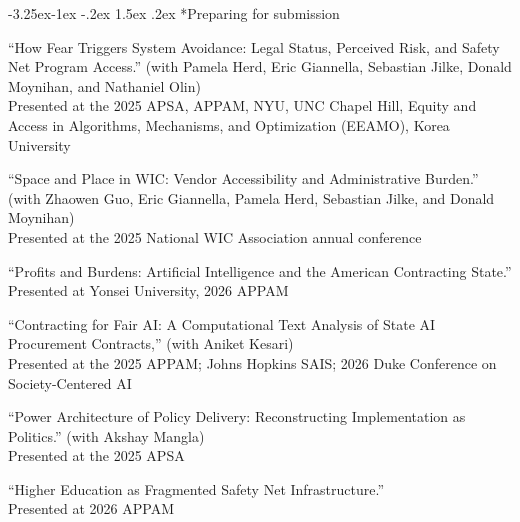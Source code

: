 \documentclass[10pt, letterpaper]{article}
\makeatletter
\renewcommand\subsection{\@startsection{subsection}{2}{\z@}%
  {-3.25ex\@plus -1ex \@minus -.2ex}%
  {1.5ex \@plus .2ex}%
  {\normalfont\large\bfseries\color{cvnavy}}}
\makeatother
\begin{document}
\subsection*{Preparing for submission}

\begin{etaremune}
    
\item ``How Fear Triggers System Avoidance: Legal Status, Perceived Risk, and Safety Net Program Access.'' (with Pamela Herd, Eric Giannella, Sebastian Jilke, Donald Moynihan, and Nathaniel Olin) 
\\ Presented at the 2025 APSA, APPAM, NYU, UNC Chapel Hill, Equity and Access in Algorithms, Mechanisms, and Optimization (EEAMO), Korea University

\item ``Space and Place in WIC: Vendor Accessibility and Administrative Burden.'' (with Zhaowen Guo, Eric Giannella, Pamela Herd, Sebastian Jilke, and Donald Moynihan) 
\\ Presented at the 2025 National WIC Association annual conference


\item ``Profits and Burdens: Artificial Intelligence and the American Contracting State.'' \\ Presented at Yonsei University, 2026 APPAM

\item ``Contracting for Fair AI: A Computational Text Analysis of State AI Procurement Contracts,'' (with Aniket Kesari) \\ Presented at the 2025 APPAM; Johns Hopkins SAIS; 2026 Duke Conference on Society-Centered AI

\item ``Power Architecture of Policy Delivery: Reconstructing Implementation as Politics.'' (with Akshay Mangla) \\ Presented at the 2025 APSA

\item ``Higher Education as Fragmented Safety Net Infrastructure.'' \\ Presented at 2026 APPAM


\end{etaremune}
\end{document}
